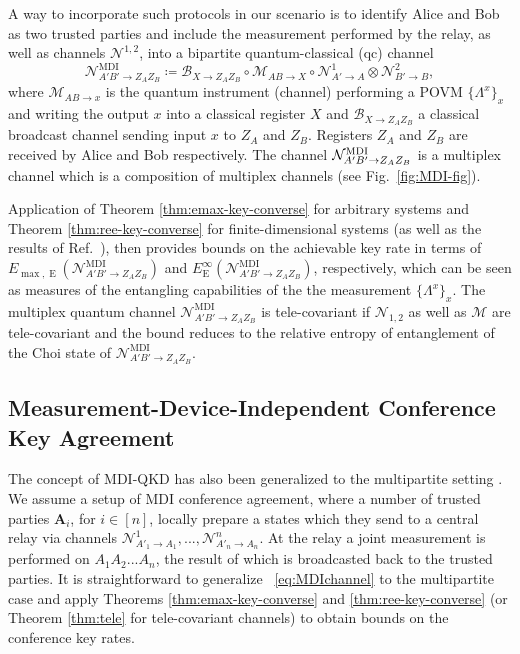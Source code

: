\documentclass[aps,pra,twocolumn,superscriptaddress,longbibliography]{revtex4-1}
\def\E{\operatorname{E}}
\newcommand{\mc}[1]{\mathcal{#1}}
\newcommand{\tf}[1]{\textbf{#1}}
\begin{document}
A way to incorporate such protocols in our scenario is to identify Alice and Bob as two trusted parties and include the measurement performed by the relay, as well as channels ${\mc N}^{1,2}$, into a bipartite quantum-classical (qc) channel 
\begin{equation}\label{eq:MDIchannel}
\mc{N}^{\text{MDI}}_{A'B'\to Z_AZ_B}\coloneqq\mc{B}_{X\to Z_AZ_B}\circ\mc{M}_{AB\to X}\circ{\mc N}^1_{A'\to A}\otimes{\mc N}^2_{B'\to B},
\end{equation}
where $\mc{M}_{AB\to x}$ is the quantum instrument (channel) performing a POVM $\{\Lambda^x\}_x$ and writing the output $x$ into a classical register $X$ and $\mc{B}_{X\to Z_AZ_B}$ a classical broadcast channel sending input $x$ to $Z_A$ and $Z_B$. Registers $Z_A$ and $Z_B$ are received by Alice and Bob respectively.
The channel ${\cal N}_{A'B'\rightarrow Z_AZ_B}^{\text{MDI}}$ is a multiplex channel which is a composition of multiplex channels (see Fig.~\ref{fig:MDI-fig}). 

Application of Theorem \ref{thm:emax-key-converse} for arbitrary systems and Theorem \ref{thm:ree-key-converse} for finite-dimensional systems (as well as the results of Ref.~\cite{DBW17,BDW18,D18thesis}), then provides bounds on the achievable key rate in terms of $E_{\max,\E}(\mc{N}^{\text{MDI}}_{A'B'\to Z_AZ_B})$ and $E^\infty_{\E}(\mc{N}^{\text{MDI}}_{A'B'\to Z_AZ_B})$, respectively, which can be seen as measures of the entangling capabilities of the the measurement $\{\Lambda^x\}_x$. The multiplex quantum channel $\mc{N}^{\text{MDI}}_{A'B'\to Z_AZ_B}$ is tele-covariant if $\mc{N}_{1,2}$ as well as $\mc{M}$ are tele-covariant and the bound reduces to the relative entropy of entanglement of the Choi state of $\mc{N}^{\text{MDI}}_{A'B'\to Z_AZ_B}$.

\subsection{Measurement-Device-Independent Conference Key Agreement}
The concept of MDI-QKD has also been generalized to the multipartite setting \cite{FYCC15,PhysRevA.93.022325,OLLP19}. We assume a setup of MDI conference agreement, where a number of trusted parties $\tf{A}_i$, for $i\in[n]$,  locally prepare a states which they send to a central relay via channels ${\mc N}^1_{A'_1\to A_1},...,{\mc N}^n_{A'_n\to A_n}$. At the relay a joint measurement is performed on $A_1A_2...A_n$, the result of which is broadcasted back to the trusted parties. It is straightforward to generalize ~\eqref{eq:MDIchannel} to the multipartite case and apply Theorems \ref{thm:emax-key-converse} and \ref{thm:ree-key-converse} (or Theorem \ref{thm:tele} for tele-covariant channels)  to obtain bounds on the conference key rates.
\end{document}
